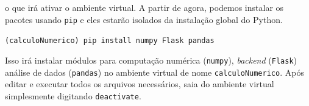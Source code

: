 \documentclass{article}
\begin{document}
	o que irá ativar o ambiente virtual. A partir de agora, podemos instalar os pacotes usando \texttt{pip} e eles estarão
	isolados da instalação global do Python. 

	\vspace{1ex} 
	\texttt{(calculoNumerico) pip install numpy Flask pandas} 
	\vspace{1ex} 

	Isso irá instalar módulos para computação numérica (\texttt{numpy}), \textit{backend} (\texttt{Flask}) 
	análise de dados (\texttt{pandas}) no ambiente virtual de nome \texttt{calculoNumerico}. Após editar e executar todos
	os arquivos necessários, saia do ambiente virtual simplesmente digitando \texttt{deactivate}. 
\end{document}

